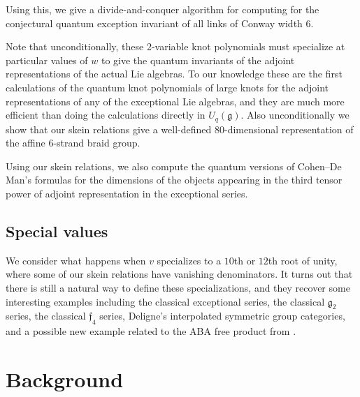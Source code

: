 \documentclass[12pt]{amsart}
\begin{document}
Using this, we give a divide-and-conquer algorithm for computing for the
conjectural quantum exception invariant of all links of Conway width 6.

Note that unconditionally, these 2-variable knot polynomials must specialize
at particular values of $w$ to give the quantum invariants of the adjoint
representations of the actual Lie algebras.  To our knowledge these are the
first calculations of the quantum knot polynomials of large knots for the
adjoint representations of any of the exceptional Lie algebras, and they are
much more efficient than doing the calculations directly in
$U_q(\mathfrak{g})$.  Also unconditionally we show that our skein relations
give a well-defined $80$-dimensional representation of the affine $6$-strand
braid group.

Using our skein relations, we also compute the quantum versions of Cohen--De
Man's formulas for the dimensions of the objects appearing in the third tensor
power of adjoint representation in the exceptional series.

\subsection{Special values}


We consider what happens when $v$ specializes to a $10$th or $12$th root of
unity, where some of our skein relations have vanishing denominators. It turns
out that there is still a natural way to define these specializations, and
they recover some interesting examples including the classical exceptional
series, the classical $\mathfrak{g}_2$ series, the classical $\mathfrak{f}_4$
series, Deligne's interpolated symmetric group categories, and a possible new
example related to the ABA free product from \cite{MR3624901}.


\section{Background}
\end{document}
